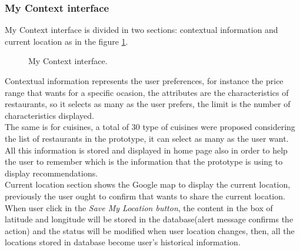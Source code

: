 \subsubsection{My Context interface}
My Context interface is divided in two sections: contextual 
information and current location as in the figure \ref{fig:mycontext}.
\begin{figure}
\captionsetup{font=footnotesize}
\centering
{}
\caption{My Context interface.}
\label{fig:mycontext}   
\end{figure}
Contextual information represents the user preferences, for instance
the price range that wants for a specific ocasion, the attributes are
the characteristics of restaurants, so it selects as many as the user
prefers, the limit is the number of characteristics displayed. \\ 
The same is for cuisines, a total of 30 type of cuisines were proposed
considering the list of restaurants in the prototype, it can select as
many as the user want.  All this information is stored and displayed
in home page also in order to help the user to remember which is the
information that the prototype is using to display recommendations.\\
 Current location section shows the Google map to display the 
 current location, previously the user ought to confirm that wants 
 to share the current location. When user click in the 
 \textit{Save My Location button}, the content in the box of latitude 
 and longitude will be stored in the database(alert message 
 confirms the action) and the status will be modified when 
 user location changes, then, all the locations stored in 
 database become user's historical information.
